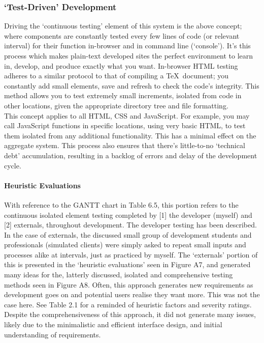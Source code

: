 \documentclass[11pt, english]{article}
\begin{document}
		\subsubsection{`Test-Driven' Development}

	Driving the `continuous testing' element of this system is the above concept; where components are constantly tested every few lines of code (or relevant interval) for their function in-browser and in command line (`console'). It's this process which makes plain-text developed sites the perfect environment to learn in, develop, and produce exactly what you want. In-browser HTML testing adheres to a similar protocol to that of compiling a {\TeX}\ document; you constantly add small elements, save and refresh to check the code's integrity. This method allows you to test extremely small increments, isolated from code in other locations, given the appropriate directory tree and file formatting.\\

	This concept applies to all HTML, CSS and JavaScript. For example, you may call JavaScript functions in specific locations, using very basic HTML, to test them isolated from any additional functionality. This has a minimal effect on the aggregate system. This process also ensures that there's little-to-no `technical debt' accumulation, resulting in a backlog of errors and delay of the development cycle.\\

			\paragraph{Heuristic Evaluations}

	With reference to the GANTT chart in Table 6.5, this portion refers to the continuous isolated element testing completed by [1] the developer (myself) and [2] externals, throughout development. The developer testing has been described. In the case of externals, the discussed small group of development students and professionals (simulated clients) were simply asked to repeat small inputs and processes alike at intervals, just as practiced by myself. The `externals' portion of this is presented in the `heuristic evaluations' seen in Figure A7, and generated many ideas for the, latterly discussed, isolated and comprehensive testing methods seen in Figure A8. Often, this approach generates new requirements as development goes on and potential users realise they want more. This was not the case here. See Table 2.1 for a reminded of heuristic factors and severity ratings. Despite the comprehensiveness of this approach, it did not generate many issues, likely due to the minimalistic and efficient interface design, and initial understanding of requirements.
\end{document}
